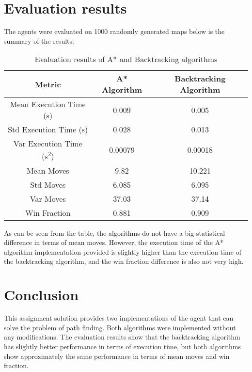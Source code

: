 \documentclass[12pt]{article}
\begin{document}
\section{Evaluation results}
The agents were evaluated on 1000 randomly generated maps below is the summary
of the results:
\begin{table}[H]
    \centering
    \begin{tabular}{|c|c|c|}
        \hline
        \textbf{Metric}                           & \textbf{A* Algorithm} & \textbf{Backtracking Algorithm} \\ \hline
        Mean Execution Time (s)                   & 0.009                 & 0.005                           \\ \hline
        Std Execution Time (s)                    & 0.028                 & 0.013                           \\ \hline
        Var Execution Time (s\textsuperscript{2}) & 0.00079               & 0.00018                         \\ \hline
        Mean Moves                                & 9.82                  & 10.221                          \\ \hline
        Std Moves                                 & 6.085                 & 6.095                           \\ \hline
        Var Moves                                 & 37.03                 & 37.14                           \\ \hline
        Win Fraction                              & 0.881                 & 0.909                           \\ \hline
    \end{tabular}
    \caption{Evaluation results of A* and Backtracking algorithms}
    \label{tab:evaluation_results}
\end{table}
As can be seen from the table, the algorithms do not have a big
statistical difference in terms of mean moves. However, the execution time of the A* algorithm implementation provided is slightly higher than the execution time of the backtracking algorithm, and the win fraction difference is also not very high.

\section{Conclusion}
This assignment solution provides two implementations of the agent that can
solve the problem of path finding. Both algorithms were implemented without any
modifications. The evaluation results show that the backtracking algorithm has
slightly better performance in terms of execution time, but both algorithms
show approximately the same performance in terms of mean moves and win
fraction.
\end{document}
